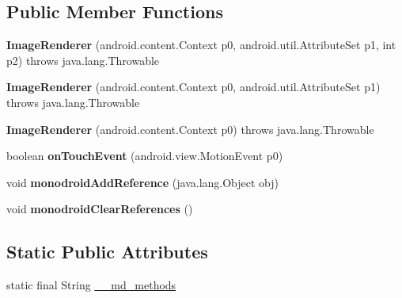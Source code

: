 \subsection*{Public Member Functions}
\begin{DoxyCompactItemize}
\item 
\mbox{\label{classmd5b60ffeb829f638581ab2bb9b1a7f4f3f_1_1ImageRenderer_ac24ca6c41669583419378dbb5e462a2e}} 
{\bfseries Image\+Renderer} (android.\+content.\+Context p0, android.\+util.\+Attribute\+Set p1, int p2)  throws java.\+lang.\+Throwable 	
\item 
\mbox{\label{classmd5b60ffeb829f638581ab2bb9b1a7f4f3f_1_1ImageRenderer_ab5e414dafd0a921bee8ec84d29ab22e0}} 
{\bfseries Image\+Renderer} (android.\+content.\+Context p0, android.\+util.\+Attribute\+Set p1)  throws java.\+lang.\+Throwable 	
\item 
\mbox{\label{classmd5b60ffeb829f638581ab2bb9b1a7f4f3f_1_1ImageRenderer_a8333cb061f46b6e67de6bd4d64f2f84d}} 
{\bfseries Image\+Renderer} (android.\+content.\+Context p0)  throws java.\+lang.\+Throwable 	
\item 
\mbox{\label{classmd5b60ffeb829f638581ab2bb9b1a7f4f3f_1_1ImageRenderer_ab69668a58532e4f57a389fa04e18015d}} 
boolean {\bfseries on\+Touch\+Event} (android.\+view.\+Motion\+Event p0)
\item 
\mbox{\label{classmd5b60ffeb829f638581ab2bb9b1a7f4f3f_1_1ImageRenderer_ad03b188cd2a6839322ff08fe076796f9}} 
void {\bfseries monodroid\+Add\+Reference} (java.\+lang.\+Object obj)
\item 
\mbox{\label{classmd5b60ffeb829f638581ab2bb9b1a7f4f3f_1_1ImageRenderer_a4787f75a8b34aa5636dbd2a7df23c9bf}} 
void {\bfseries monodroid\+Clear\+References} ()
\end{DoxyCompactItemize}
\subsection*{Static Public Attributes}
\begin{DoxyCompactItemize}
\item 
static final String \hyperlink{classmd5b60ffeb829f638581ab2bb9b1a7f4f3f_1_1ImageRenderer_a270ae274b970d099f33432d32109ce8b}{\+\_\+\+\_\+md\+\_\+methods}
\end{DoxyCompactItemize}
